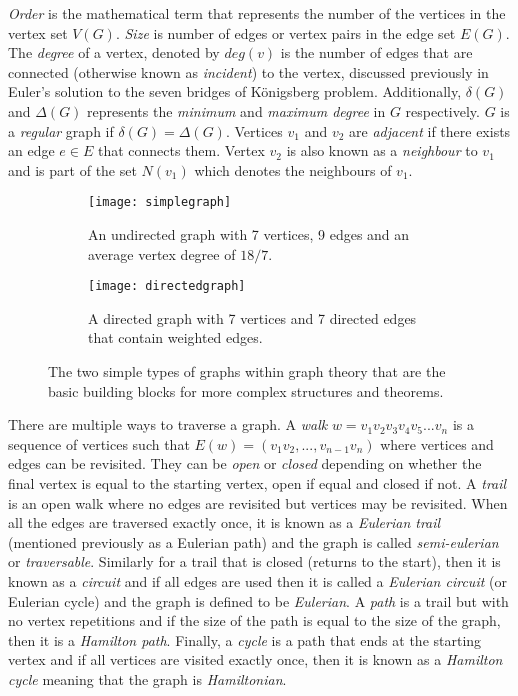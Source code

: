 \emph{Order} is the mathematical term that represents the number of the vertices in the vertex set $V(G)$. \emph{Size} is number of edges or vertex pairs in the edge set $E(G)$. The \emph{degree} of a vertex, denoted by $deg(v)$ is the number of edges that are connected (otherwise known as \emph{incident}) to the vertex, discussed previously in Euler's solution to the seven bridges of Königsberg problem. Additionally, $\delta(G)$ and $\Delta(G)$ represents the \emph{minimum} and \emph{maximum degree} in $G$ respectively. $G$ is a \emph{regular} graph if $\delta(G) = \Delta(G)$. Vertices $v_{1}$ and $v_{2}$ are \emph{adjacent} if there exists an edge $e \in E$ that connects them. Vertex $v_{2}$ is also known as a \emph{neighbour} to $v_{1}$ and is part of the set $N(v_{1})$ which denotes the neighbours of $v_{1}$. 
\newline

\begin{figure}[!htb]
\centering
\begin{subfigure}{.45\textwidth}
	\texttt{[image: simplegraph]}
	\caption{An undirected graph with 7 vertices, 9 edges and an average vertex degree of $18/7$.}
	\label{fig:Simple Graph}
\end{subfigure}
\hfill
\begin{subfigure}{.45\textwidth}
	\texttt{[image: directedgraph]}
	\caption{A directed graph with 7 vertices and 7 directed edges that contain weighted edges.}
	\label{fig:Directed Graph}
\end{subfigure}
\caption{The two simple types of graphs within graph theory that are the basic building blocks for more complex structures and theorems.}
\end{figure}

There are multiple ways to traverse a graph. A \emph{walk} $w = v_1v_2v_3v_4v_5...v_n$ is a sequence of vertices such that $E(w) = (v_1v_2,...,v_{n-1}v_n)$ where vertices and edges can be revisited. They can be \emph{open} or \emph{closed} depending on whether the final vertex is equal to the starting vertex, open if equal and closed if not. A \emph{trail} is an open walk where no edges are revisited but vertices may be revisited. When all the edges are traversed exactly once, it is known as a \emph{Eulerian trail} (mentioned previously as a Eulerian path) and the graph is called \emph{semi-eulerian} or \emph{traversable}. Similarly for a trail that is closed (returns to the start), then it is known as a \emph{circuit} and if all edges are used then it is called a \emph{Eulerian circuit} (or Eulerian cycle) and the graph is defined to be \emph{Eulerian}. A \emph{path} is a trail but with no vertex repetitions and if the size of the path is equal to the size of the graph, then it is a \emph{Hamilton path}. Finally, a \emph{cycle} is a path that ends at the starting vertex and if all vertices are visited exactly once, then it is known as a \emph{Hamilton cycle} meaning that the graph is \emph{Hamiltonian}.
\newline

